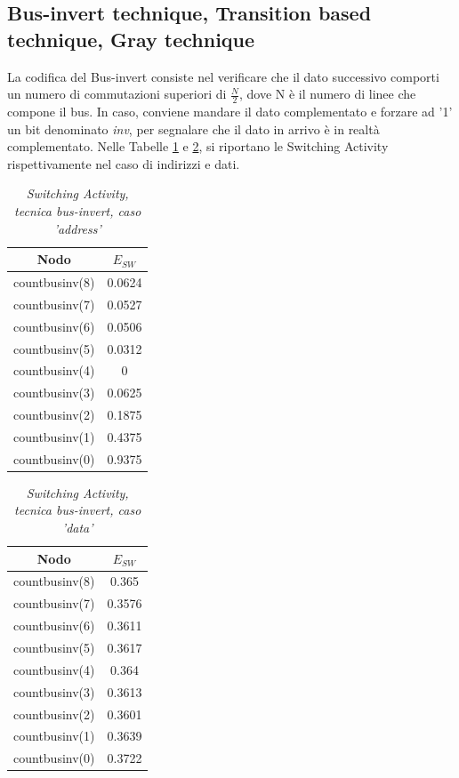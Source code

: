 \subsection{Bus-invert technique, Transition based technique, Gray technique}
La codifica del Bus-invert consiste nel verificare che il dato successivo comporti un numero di commutazioni superiori di $\frac{N}{2}$, dove N è il numero di linee che compone il bus. In caso, conviene mandare il dato complementato e forzare ad '1' un bit denominato \textit{inv}, per segnalare che il dato in arrivo è in realtà complementato. Nelle Tabelle \ref{Tab3} e \ref{Tab4}, si riportano le Switching Activity rispettivamente nel caso di indirizzi e dati.\\
\begin{table}[!h]\footnotesize
	\centering
	\begin{tabular}{|c|c|}
		\hline
		\textbf{Nodo} & \textbf{$E_{SW}$}\\
		\hline
		countbusinv(8) & 0.0624\\
		countbusinv(7) & 0.0527\\
		countbusinv(6) & 0.0506\\
		countbusinv(5) & 0.0312\\
		countbusinv(4) & 0\\
		countbusinv(3) & 0.0625\\
		countbusinv(2) & 0.1875\\
		countbusinv(1) & 0.4375\\
		countbusinv(0) & 0.9375\\
		\hline
	\end{tabular}
	\caption{\textit{Switching Activity, tecnica bus-invert, caso 'address'}}
	\label{Tab3}
\end{table}
\begin{table}[!h]\footnotesize
	\centering
	\begin{tabular}{|c|c|}
		\hline
		\textbf{Nodo} & \textbf{$E_{SW}$}\\
		\hline
		countbusinv(8) & 0.365\\
		countbusinv(7) & 0.3576\\
		countbusinv(6) & 0.3611\\
		countbusinv(5) & 0.3617\\
		countbusinv(4) & 0.364\\
		countbusinv(3) & 0.3613\\
		countbusinv(2) & 0.3601\\
		countbusinv(1) & 0.3639\\
		countbusinv(0) & 0.3722\\
		\hline
	\end{tabular}
	\caption{\textit{Switching Activity, tecnica bus-invert, caso 'data'}}
	\label{Tab4}
\end{table}

